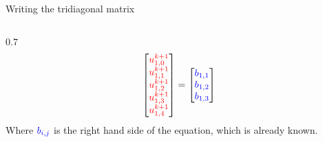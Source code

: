 \documentclass{beamer}
\begin{document}
\begin{frame}{Writing the tridiagonal matrix}
\begin{columns}
\begin{column}{0.7\textwidth}
{\begin{align*}
\begin{bmatrix}
                        \textcolor{red}{u_{1,0}^{k+1}} \\
                        \textcolor{red}{u_{1,1}^{k+1}} \\
                        \textcolor{red}{u_{1,2}^{k+1}} \\
                        \textcolor{red}{u_{1,3}^{k+1}} \\
                        \textcolor{red}{u_{1,4}^{k+1}} \\
                    \end{bmatrix}
                    =
                    \begin{bmatrix}
                        \textcolor{blue}{b_{1,1}} \\
                        \textcolor{blue}{b_{1,2}} \\
                        \textcolor{blue}{b_{1,3}} \\
                    \end{bmatrix}
                \end{align*}
            Where $\textcolor{blue}{b_{i,j}}$ is the right hand side of the equation, which is already known.
            }
        \end{column}
    \end{columns}
    \vspace{-1cm}
\end{frame}
\end{document}
